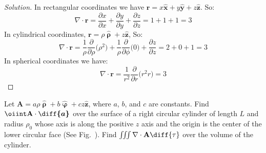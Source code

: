 \documentclass[crop=false,class=article,oneside]{standalone}
\begin{document}
        \begin{proof}[Solution]
            In rectangular coordinates we have
            $\mathbf{r}%
             =x\hat{\mathbf{x}}%
             +y\hat{\mathbf{y}}%
             +z\hat{\mathbf{z}}$.
            So:
            \begin{equation*}
                \nabla\cdot\mathbf{r}
                =\frac{\partial x}{\partial x}
                +\frac{\partial y}{\partial y}
                +\frac{\partial z}{\partial z}
                =1+1+1
                =3
            \end{equation*}
            In cylindrical coordinates,
            $\mathbf{r}%
             =\rho\hat{\boldsymbol{\uprho}}%
             +z\hat{\mathbf{z}}$,
            So:
            \begin{equation*}
                \nabla\cdot\mathbf{r}
                =\frac{1}{\rho}
                \frac{\partial}{\partial\rho}
                \big(\rho^2\big)
                +\frac{1}{\rho}
                \frac{\partial}{\partial\phi}
                \big(0\big)
                +\frac{\partial z}{\partial z}
                =2+0+1
                =3
            \end{equation*}
            In spherical coordinates we have:
            \begin{equation*}
                \nabla\cdot\mathbf{r}
                =\frac{1}{r^{2}}
                \frac{\partial}{\partial{r}}
                \big(r^{2}r\big)
                =3
            \end{equation*}
        \end{proof}
        \begin{problem}[Wangsness 1-22]
        \label{problem:EMAG_wangsness_1_22}
            Let
            $\mathbf{A}%
             =a\rho\hat{\boldsymbol{\uprho}}%
             +b\hat{\boldsymbol{\upvarphi}}%
             +cz\hat{\mathbf{z}}$,
            where $a$, $b$, and $c$ are constants.
            Find $\oiint\mathbf{A}\cdot\boldsymbol{\diff{a}}$
            over the surface of a right circular cylinder of length
            $L$ and radius $\rho_{0}$ whose axis is along the
            positive $z$ axis and the origin is the center
            of the lower circular face
            (See Fig.~).
            Find $\iiint\nabla\cdot\mathbf{A}\diff{\tau}$
            over the volume of the cylinder.
        \end{problem}
\end{document}
